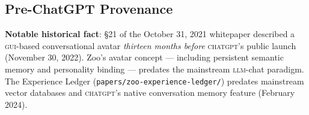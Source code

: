 \subsection{Pre-ChatGPT Provenance}

\textbf{Notable historical fact}: \S21 of the October 31, 2021
whitepaper described a \textsc{gui}-based conversational \AI{} avatar
\emph{thirteen months before} \textsc{chatgpt}'s public launch
(November 30, 2022). Zoo's avatar \AI{} concept --- including persistent
semantic memory and personality binding --- predates the mainstream
\textsc{llm}-chat paradigm. The Experience Ledger
(\texttt{papers/zoo-experience-ledger/}) predates mainstream vector
databases and \textsc{chatgpt}'s native conversation memory feature
(February 2024).
